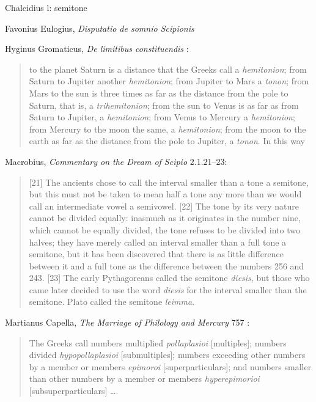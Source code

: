 \documentclass{amsart}
\theoremstyle{definition}
\begin{document}
Chalcidius l: semitone \cite{calcidius}

Favonius Eulogius, {\em Disputatio de somnio Scipionis} \cite{favonius}

Hyginus Gromaticus, {\em De limitibus constituendis} \cite[p.~146]{campbell}:

\begin{quote}
to the planet Saturn is a distance that the Greeks call a {\em hemitonion}; from Saturn to
Jupiter another {\em hemitonion}; from Jupiter to Mars a {\em tonon}; from Mars to the sun is
three times as far as the distance from the pole to Saturn, that is, a {\em trihemitonion}; from
the sun to Venus is as far as from Saturn to Jupiter, a {\em hemitonion}; from Venus to
Mercury a {\em hemitonion}; from Mercury to the moon the same, a {\em hemitonion}; from the
moon to the earth as far as the distance from the pole to Jupiter, a {\em tonon}. In this way
\end{quote}

Macrobius, {\em Commentary on the Dream of Scipio} \cite[pp.~188--189]{macrobius} 2.1.21--23:

\begin{quote}
[21] The ancients chose to call the interval smaller than a tone a semitone, but this must not be taken to mean half a tone
any more than we would call an intermediate vowel a semivowel. [22] The tone by its
very nature cannot be divided equally: inasmuch as it originates in the number nine, which cannot be equally divided,
the tone refuses to be divided into two halves; they have merely called an interval smaller than a full tone a semitone,
but it has been discovered that there is as little difference between it and a full tone as the difference
between the numbers 256 and 243. [23] The early Pythagoreans called the semitone {\em diesis}, but those who came later
decided to use the word {\em diesis} for the interval smaller than the semitone. Plato called the semitone
{\em leimma}.
\end{quote}

Martianus Capella, {\em The Marriage of Philology and Mercury} \cite{martianusII} 757 \cite[p.~293]{martianusII}:

\begin{quote}
The Greeks call numbers multiplied {\em pollaplasioi}
[multiples]; numbers divided {\em hypopollaplasioi} [submultiples];
numbers exceeding other numbers by a member or members {\em epimoroi}
[superparticulars]; and numbers smaller than other numbers by a 
member or members {\em hyperepimorioi} [subsuperparticulars] \dots.
\end{quote}
\end{document}
